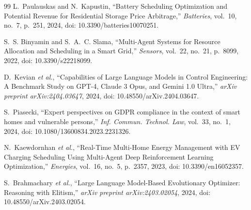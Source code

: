 \documentclass[conference]{IEEEtran}
\begin{document}
\begin{thebibliography}{99}
L.~Paulauskas and N.~Kapustin,
``Battery Scheduling Optimization and Potential Revenue for Residential
Storage Price Arbitrage,''
\textit{Batteries}, vol.~10, no.~7, p.~251, 2024,
doi: 10.3390/batteries10070251.

S.~S. Binyamin and S.~A.~C. Slama,
``Multi-Agent Systems for Resource Allocation and Scheduling in a Smart Grid,''
\textit{Sensors}, vol.~22, no.~21, p.~8099, 2022,
doi: 10.3390/s22218099.

D.~Kevian \textit{et al.},
``Capabilities of Large Language Models in Control Engineering:
A Benchmark Study on GPT-4, Claude 3 Opus, and Gemini 1.0 Ultra,''
\textit{arXiv preprint arXiv:2404.03647}, 2024,
doi: 10.48550/arXiv.2404.03647.

S.~Piasecki,
``Expert perspectives on GDPR compliance in the context of smart homes
and vulnerable persons,''
\textit{Inf. Commun. Technol. Law}, vol.~33, no.~1, 2024,
doi: 10.1080/13600834.2023.2231326.

N.~Kaewdornhan \textit{et al.},
``Real-Time Multi-Home Energy Management with EV Charging Scheduling
Using Multi-Agent Deep Reinforcement Learning Optimization,''
\textit{Energies}, vol.~16, no.~5, p.~2357, 2023,
doi: 10.3390/en16052357.

S.~Brahmachary \textit{et al.},
``Large Language Model-Based Evolutionary Optimizer: Reasoning with Elitism,''
\textit{arXiv preprint arXiv:2403.02054}, 2024,
doi: 10.48550/arXiv.2403.02054.

\end{thebibliography}
\end{document}
